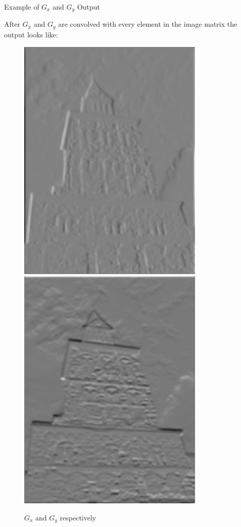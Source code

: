 \documentclass{beamer}
\begin{document}
\begin{frame}{Example of $G_{x}$ and $G_{y}$ Output}

After $G_{x}$ and $G_{y}$ are convolved with every element in the image matrix the output looks like:

\begin{figure}[ht]
\includegraphics[width= 1.4 in]{churchx.jpg}
\hspace{0.5 in}
\includegraphics[width= 1.4 in]{churchy.jpg}
\caption{$G_{x}$ and $G_{y}$ respectively}
\end{figure}

\end{frame}
\end{document}
